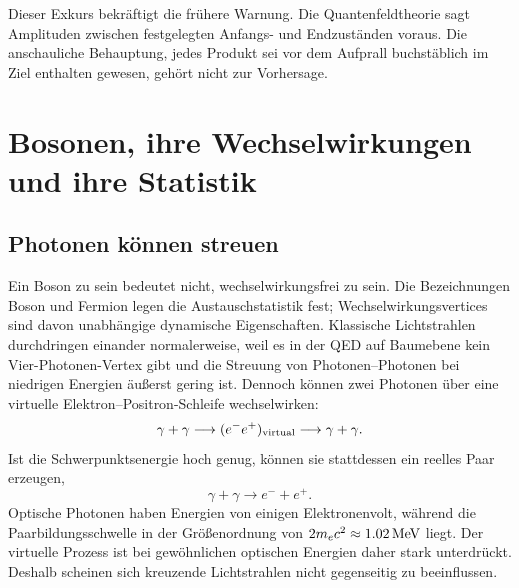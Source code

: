 Dieser Exkurs bekräftigt die frühere Warnung. Die Quantenfeldtheorie sagt Amplituden zwischen festgelegten Anfangs- und Endzuständen voraus. Die anschauliche Behauptung, jedes Produkt sei vor dem Aufprall buchstäblich im Ziel enthalten gewesen, gehört nicht zur Vorhersage.

\section{Bosonen, ihre Wechselwirkungen und ihre Statistik}

\subsection{Photonen können streuen}

Ein Boson zu sein bedeutet nicht, wechselwirkungsfrei zu sein. Die Bezeichnungen Boson und Fermion legen die Austauschstatistik fest; Wechselwirkungsvertices sind davon unabhängige dynamische Eigenschaften.
Klassische Lichtstrahlen durchdringen einander normalerweise, weil es in der QED auf Baumebene kein Vier-Photonen-Vertex gibt und die Streuung von Photonen--Photonen bei niedrigen Energien äußerst gering ist. Dennoch können zwei Photonen über eine virtuelle Elektron--Positron-Schleife wechselwirken:
\begin{equation}
  \gamma+\gamma
  \longrightarrow(e^-e^+)_{\rm virtual}
  \longrightarrow\gamma+\gamma.
\end{equation}
Ist die Schwerpunktsenergie hoch genug, können sie stattdessen ein reelles Paar erzeugen,
\begin{equation}
  \gamma+\gamma\longrightarrow e^-+e^+.
\end{equation}
Optische Photonen haben Energien von einigen Elektronenvolt, während die Paarbildungsschwelle in der Größenordnung von \(2m_e c^2\approx1.02\,{\rm MeV}\) liegt. Der virtuelle Prozess ist bei gewöhnlichen optischen Energien daher stark unterdrückt. Deshalb scheinen sich kreuzende Lichtstrahlen nicht gegenseitig zu beeinflussen.

\begin{classroomqa}
\end{classroomqa}

